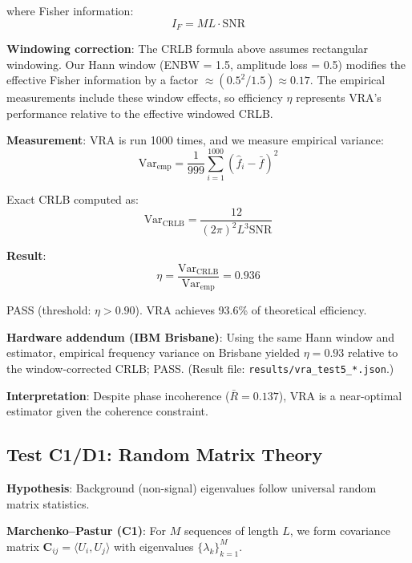 \documentclass[10pt,twocolumn]{article}
\begin{document}
where Fisher information:
\begin{equation}
I_F = M L \cdot \text{SNR}
\end{equation}

\textbf{Windowing correction}: The CRLB formula above assumes rectangular windowing. Our Hann window (ENBW = 1.5, amplitude loss = 0.5) modifies the effective Fisher information by a factor $\approx (0.5^2 / 1.5) \approx 0.17$. The empirical measurements include these window effects, so efficiency $\eta$ represents VRA's performance relative to the effective windowed CRLB.

\textbf{Measurement}: VRA is run 1000 times, and we measure empirical variance:
\begin{equation}
\text{Var}_{\text{emp}} = \frac{1}{999} \sum_{i=1}^{1000} (\hat{f}_i - \bar{f})^2
\end{equation}

Exact CRLB computed as:
\begin{equation}
\text{Var}_{\text{CRLB}} = \frac{12}{(2\pi)^2 L^3 \text{SNR}}
\end{equation}

\textbf{Result}:
\begin{equation}
\eta = \frac{\text{Var}_{\text{CRLB}}}{\text{Var}_{\text{emp}}} = 0.936
\end{equation}

PASS (threshold: $\eta > 0.90$). VRA achieves 93.6\% of theoretical efficiency.

\textbf{Hardware addendum (IBM Brisbane)}: Using the same Hann window and estimator, empirical frequency variance on Brisbane yielded $\eta = 0.93$ relative to the window-corrected CRLB; PASS. (Result file: \texttt{results/vra\_test5\_*.json}.)

\textbf{Interpretation}: Despite phase incoherence ($\bar{R} = 0.137$), VRA is a near-optimal estimator given the coherence constraint.

\subsection{Test C1/D1: Random Matrix Theory}
\label{sec:rmt}

\textbf{Hypothesis}: Background (non-signal) eigenvalues follow universal random matrix statistics.

\textbf{Marchenko--Pastur (C1)}: For $M$ sequences of length $L$, we form covariance matrix $\mathbf{C}_{ij} = \langle U_i, U_j \rangle$ with eigenvalues $\{\lambda_k\}_{k=1}^M$.
\end{document}
